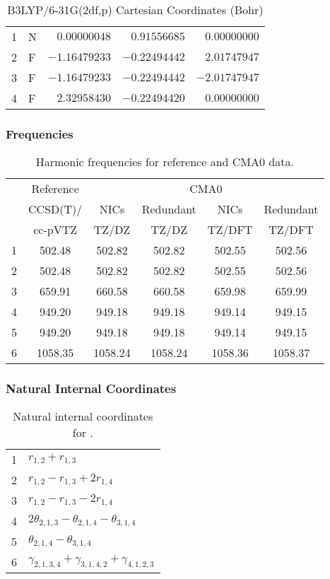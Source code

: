\documentclass[10pt,oneside]{article}
\begin{document}
\begin{table}[h]
\centering
\caption{B3LYP/6-31G(2df,p) Cartesian Coordinates (Bohr)}
\begin{tabular}{llrrr}
\toprule
1  & N  & $ 0.00000048$ & $ 0.91556685$ & $ 0.00000000$ \\
2  & F  & $-1.16479233$ & $-0.22494442$ & $ 2.01747947$ \\
3  & F  & $-1.16479233$ & $-0.22494442$ & $-2.01747947$ \\
4  & F  & $ 2.32958430$ & $-0.22494420$ & $ 0.00000000$ \\
\bottomrule
\end{tabular}
\end{table}

\begin{table}[h!]
\subsubsection*{Frequencies}
\centering
\caption{Harmonic frequencies for reference and CMA0 data.}
\begin{tabular}{cccccc}
\toprule
{} & Reference & \multicolumn{4}{c}{CMA0} \\
{} &  CCSD(T)/ &    NICs &  Redundant &    NICs & Redundant \\
{} &   cc-pVTZ &   TZ/DZ &      TZ/DZ &  TZ/DFT &    TZ/DFT \\
\midrule
1 &    502.48 &  502.82 &     502.82 &  502.55 &    502.56 \\
2 &    502.48 &  502.82 &     502.82 &  502.55 &    502.56 \\
3 &    659.91 &  660.58 &     660.58 &  659.98 &    659.99 \\
4 &    949.20 &  949.18 &     949.18 &  949.14 &    949.15 \\
5 &    949.20 &  949.18 &     949.18 &  949.14 &    949.15 \\
6 &   1058.35 & 1058.24 &    1058.24 & 1058.36 &   1058.37 \\
\bottomrule
\end{tabular}
\end{table}

\begin{table}[h!]
\subsubsection*{Natural Internal Coordinates}
\centering
\caption{Natural internal coordinates for .}
\small
\begin{tabular}{ll}
\toprule
  1   & $r_{1,2} + r_{1,3}$ \\
  2   & $r_{1,2} - r_{1,3} + 2r_{1,4}$ \\
  3   & $r_{1,2} - r_{1,3} - 2r_{1,4}$ \\
  4   & $2\theta_{2,1,3} - \theta_{2,1,4} - \theta_{3,1,4}$ \\
  5   & $\theta_{2,1,4} - \theta_{3,1,4}$ \\
  6   & $\gamma_{2,1,3,4} + \gamma_{3,1,4,2} + \gamma_{4,1,2,3}$ \\
\bottomrule
\end{tabular}
\end{table}
\end{document}
